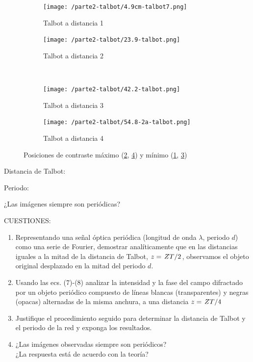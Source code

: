 \documentclass{./packages/optica-article}
\begin{document}
\begin{figure}[hptb]
\begin{center}
    \begin{subfigure}[t]{0.45\textwidth}\centering
        \texttt{[image: /parte2-talbot/4.9cm-talbot7.png]}
        \caption{ Talbot a distancia 1}
        \label{fig:talbot1}	
    \end{subfigure}
	\hfill
	\begin{subfigure}[t]{0.45\textwidth}\centering
		\texttt{[image: /parte2-talbot/23.9-talbot.png]}
        \caption{Talbot a distancia 2}
        \label{fig:talbot2}
	\end{subfigure}
	\\
	\begin{subfigure}[t]{0.45\textwidth}\centering
		\texttt{[image: /parte2-talbot/42.2-talbot.png]}
        \caption{ Talbot a distancia 3}
        \label{fig:talbot3}
	\end{subfigure}
	\hfill
	\begin{subfigure}[t]{0.45\textwidth}\centering
		\texttt{[image: /parte2-talbot/54.8-2a-talbot.png]}
        \caption{ Talbot a distancia 4}
        \label{fig:talbot4}
	\end{subfigure}
	
\caption{Posiciones de contraste máximo (\ref{fig:talbot2}, \ref{fig:talbot4}) y mínimo (\ref{fig:talbot1}, \ref{fig:talbot3})%
	}
	\label{fig:alltalbot}
\end{center}
\end{figure}

Distancia de Talbot: 

Periodo: 

¿Las imágenes siempre son periódicas?

CUESTIONES:
\begin{enumerate}
\item Representando una señal óptica periódica (longitud de onda $\lambda$, periodo $d$) como una serie de Fourier, demostrar analíticamente que en las distancias iguales a la mitad de la distancia de Talbot, $z=\flatfrac{ZT}{2}$, observamos el objeto original desplazado en la mitad del periodo $d$.
\item Usando las ecs. (7)-(8) analizar la intensidad y la fase del campo difractado por un objeto periódico compuesto de líneas blancas (transparentes) y negras (opacas) alternadas de la misma anchura, a una distancia $z=\flatfrac{ZT}{4}$
\item Justifique el procedimiento seguido para determinar la distancia de Talbot y el periodo de la red y exponga los resultados.
\item ¿Las imágenes observadas siempre son periódicos? \\¿La respuesta está de acuerdo con la teoría?
\end{enumerate}
\end{document}
